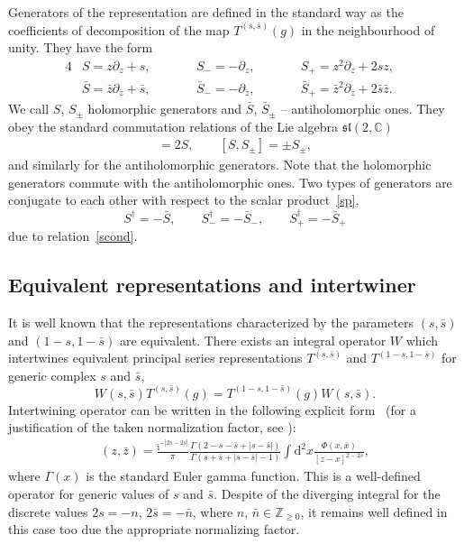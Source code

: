 \documentclass[10pt,a4paper]{amsart}
\renewcommand{\imath}{\mathrm{i}}
\numberwithin{equation}{section}
\begin{document}
Generators of the representation are defined in the standard way as the coefficients of decomposition of the map $T^{(s,\bar{s})}(g)$ in the neighbourhood of unity.
They have the form
\begin{alignat}{4}
		&S = z\partial_z + s, \qquad&& S_- = -\partial_z, \qquad&&
		S_+ = z^2\partial_z+2sz,& \nonumber\\
		&
		\bar{S} = \bar{z}\partial_{\bar{z}} + \bar{s}, \qquad&& \bar{S}_- = -\partial_{\bar{z}}, \qquad&&
		\bar{S}_+ = \bar{z}^2\partial_{\bar{z}}+2\bar{s}\bar{z} .&\label{gen}
\end{alignat}
We call $S$, $S_{\pm}$ holomorphic generators and $\bar{S}$, $\bar{S}_\pm$ -- antiholomorphic ones. They obey the standard commutation relations of the Lie algebra $\mathfrak{sl}(2,\mathbb{C})$
\begin{align*}
	[S_+, S_-] = 2S, \qquad [S,S_\pm] = \pm S_\pm,
\end{align*}
and similarly for the antiholomorphic generators. Note that the holomorphic generators commute with the antiholomorphic ones. Two types of generators are conjugate to each other with respect to the scalar product~\eqref{sp},
\begin{equation} \label{Shc}
	S^\dagger = -\bar{S}, \qquad S_-^\dagger = -\bar{S}_-, \qquad
	S_+^\dagger = -\bar{S}_+
\end{equation}
due to relation~\eqref{scond}.


\subsection{Equivalent representations and intertwiner}

It is well known \cite{GGV, GN} that the representations characterized by the
parameters $(s, \bar s)$ and $(1-s, 1-\bar{s})$ are equivalent.
There exists an integral operator $W$ which intertwines
equivalent principal series representations $T^{(s,\bar{s})}$
and $T^{(1-s,1-\bar{s})}$ for generic complex $s$ and $\bar{s}$,
\begin{equation*}
W(s,\bar{s}) T^{(s,\bar{s})}(g) =
T^{(1-s,1-\bar{s})}(g) W(s,\bar{s}) .
\end{equation*}
Intertwining operator can be written in the following explicit form~\cite{GGV}
(for a justification of the taken normalization factor,
see \cite{DM1}):
\begin{align*}
 [ W(s,\bar{s}) \Phi ](z,\bar{z}) =
\frac{\imath^{-|2s-2\bar s|}}{\pi}
 \frac{\Gamma (2-s-\bar s+|s-\bar s| )}
{\Gamma (s+\bar s+|s-\bar s| -1 )}
\int \mathrm{d}^2 x \frac{\Phi(x,\bar{x})}{[z-x]^{2-2s}},
\end{align*}
where $\Gamma(x)$ is the standard Euler gamma function.
This is a well-defined operator for generic values of $s$ and $\bar{s}$.
Despite of the diverging integral for the discrete values $2s = -n$,
$2\bar{s} = -\bar{n}$, where $n$, $\bar{n} \in \mathbb{Z}_{\geq 0}$,
it remains well defined in this case too due the appropriate
normalizing factor.
\end{document}
